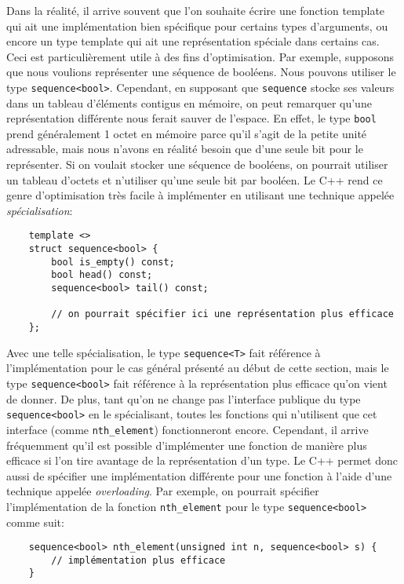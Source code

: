 Dans la réalité, il arrive souvent que l'on souhaite écrire une fonction
template qui ait une implémentation bien spécifique pour certains types
d'arguments, ou encore un type template qui ait une représentation spéciale
dans certains cas. Ceci est particulièrement utile à des fins d'optimisation.
Par exemple, supposons que nous voulions représenter une séquence de booléens.
Nous pouvons utiliser le type {\tt sequence<bool>}. Cependant, en supposant
que {\tt sequence} stocke ses valeurs dans un tableau d'éléments contigus en
mémoire, on peut remarquer qu'une représentation différente nous ferait sauver
de l'espace. En effet, le type {\tt bool} prend généralement 1 octet en mémoire
parce qu'il s'agit de la petite unité adressable, mais nous n'avons en réalité
besoin que d'une seule bit pour le représenter. Si on voulait stocker une
séquence de booléens, on pourrait utiliser un tableau d'octets et n'utiliser
qu'une seule bit par booléen. Le C++ rend ce genre d'optimisation très facile
à implémenter en utilisant une technique appelée \textit{spécialisation}:
\begin{verbatim}
    template <>
    struct sequence<bool> {
        bool is_empty() const;
        bool head() const;
        sequence<bool> tail() const;

        // on pourrait spécifier ici une représentation plus efficace
    };
\end{verbatim}

Avec une telle spécialisation, le type {\tt sequence<T>} fait référence à
l'implémentation pour le cas général présenté au début de cette section,
mais le type {\tt sequence<bool>} fait référence à la représentation plus
efficace qu'on vient de donner. De plus, tant qu'on ne change pas l'interface
publique du type {\tt sequence<bool>} en le spécialisant, toutes les fonctions
qui n'utilisent que cet interface (comme {\tt nth\_element}) fonctionneront
encore. Cependant, il arrive fréquemment qu'il est possible d'implémenter une
fonction de manière plus efficace si l'on tire avantage de la représentation
d'un type. Le C++ permet donc aussi de spécifier une implémentation différente
pour une fonction à l'aide d'une technique appelée \textit{overloading}. Par
exemple, on pourrait spécifier l'implémentation de la fonction
{\tt nth\_element} pour le type {\tt sequence<bool>} comme suit:
\begin{verbatim}
    sequence<bool> nth_element(unsigned int n, sequence<bool> s) {
        // implémentation plus efficace
    }
\end{verbatim}

